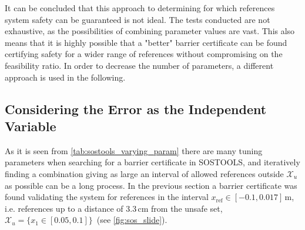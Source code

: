 %
%
%

\vspace{-2mm}
It can be concluded that this approach to determining for which references system safety can be guaranteed is not ideal. The tests conducted are not exhaustive, as the possibilities of combining parameter values are vast. This also means that it is highly possible that a "better" barrier certificate can be found certifying safety for a wider range of references without compromising on the feasibility ratio.
In order to decrease the number of parameters, a different approach is used in the following.

\subsection{Considering the Error as the Independent Variable}\label{sec:sos_1storder_error}

As it is seen from \autoref{tab:sostools_varying_param} there are many tuning parameters when searching for a barrier certificate in SOSTOOLS, and iteratively finding a combination giving as large an interval of allowed references outside $\mathcal{X}_u$ as possible can be a long process. 
In the previous section a barrier certificate was found validating the system for references in the interval $x_\text{ref}\in [-0.1,0.017]$\,m, i.e. references up to a distance of 3.3\,cm from the unsafe set, $\mathcal{X}_u=\{x_1\in[0.05,0.1]\}$\, (see \ref{fig:sos_slide}). 

